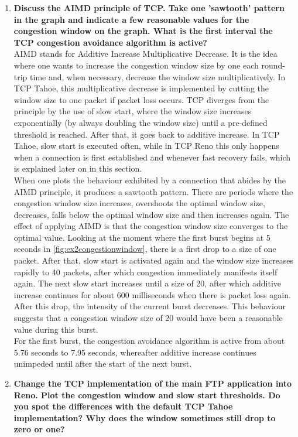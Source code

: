 \begin{enumerate}
 \item \textbf{Discuss the AIMD principle of TCP. Take one 'sawtooth' pattern in the graph and indicate a few
 reasonable values for the congestion window on the graph. What is the first interval the TCP congestion avoidance
 algorithm is active?} \\
 
 AIMD stands for Additive Increase Multiplicative Decrease. It is the idea where one wants to increase the congestion window
 size by one each round-trip time and, when necessary, decrease the window size multiplicatively. In TCP Tahoe, this
 multiplicative decrease is implemented by cutting the window size to one packet if packet loss occurs. TCP diverges
 from the principle by the use of slow start, where the window size increases exponentially (by always doubling the
 window size) until a pre-defined threshold is reached. After that, it goes back to additive increase. In TCP Tahoe,
 slow start is executed often, while in TCP Reno this only happens when a connection is first established and
 whenever fast recovery fails, which is explained later on in this section. \\
 
 When one plots the behaviour exhibited by a connection that abides by the AIMD principle, it produces a sawtooth pattern.
 There are periods where the congestion window size increases, overshoots the optimal window size, decreases, falls
 below the optimal window size and then increases again. The effect of applying AIMD
 is that the congestion window size converges to the optimal value. Looking at the moment where the first burst begins at 5 seconds in \ref{fig:ex2congestionwindow},
 there is a first drop to a size of one packet. After that, slow start is activated again and the window size increases
 rapidly to 40 packets, after which congestion immediately manifests itself again. The next slow start increases until
 a size of 20, after which additive increase continues for about 600 milliseconds when there is packet loss again.
 After this drop, the intensity of the current burst decreases. This behaviour suggests that a congestion window size
 of 20 would have been a reasonable value during this burst. \\
 
 For the first burst, the congestion avoidance algorithm is active from about 5.76 seconds to 7.95 seconds, whereafter
 additive increase continues unimpeded until after the start of the next burst.
 
 \item \textbf{Change the TCP implementation of the main FTP application into Reno. Plot the congestion window
 and slow start thresholds. Do you spot the differences with the default TCP Tahoe implementation? Why does the
 window sometimes still drop to zero or one?} \\
 

\end{enumerate}
